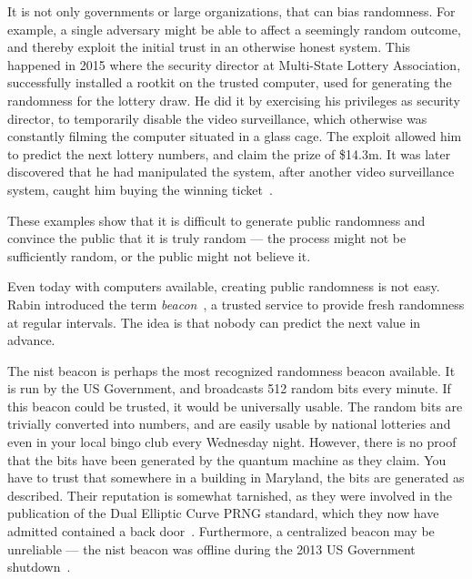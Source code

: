 It is not only governments or large organizations, that can bias randomness.
For example, a single adversary might be able to affect a seemingly random outcome, and thereby exploit the initial trust in an otherwise honest system.
This happened in 2015 where the security director at Multi-State Lottery Association, successfully installed a rootkit on the trusted computer, used for generating the randomness for the lottery draw.
He did it by exercising his privileges as security director, to temporarily disable the video surveillance, which otherwise was constantly filming the computer situated in a glass cage.
The exploit allowed him to predict the next lottery numbers, and claim the prize of \$14.3m.
It was later discovered that he had manipulated the system, after another video surveillance system, caught him buying the winning ticket~\cite{bbclotteryexploit}.


These examples show that it is difficult to generate public randomness and convince the public that it is truly random --- the process might not be sufficiently random, or the public might not believe it.

Even today with computers available, creating public randomness is not easy. Rabin introduced the term \emph{beacon}~\cite{rabin1983transaction}, a trusted service to provide fresh randomness at regular intervals. The idea is that nobody can predict the next value in advance.

The \gls{nist} beacon is perhaps the most recognized randomness beacon available.
It is run by the US Government, and broadcasts 512 random bits every minute.
If this beacon could be trusted, it would be universally usable. The random bits are trivially converted into numbers, and are easily usable by national lotteries and even in your local bingo club every Wednesday night.
However, there is no proof that the bits have been generated by the quantum machine as they claim. You have to trust that somewhere in a building in Maryland, the bits are generated as described.
Their reputation is somewhat tarnished, as they were involved in the publication of the Dual Elliptic Curve PRNG standard, which they now have admitted contained a back door~\cite{nist2014backdoor}.
Furthermore, a centralized beacon may be unreliable --- the \gls{nist} beacon was offline during the 2013 US Government shutdown~\cite{bonneau2015bitcoin}.

